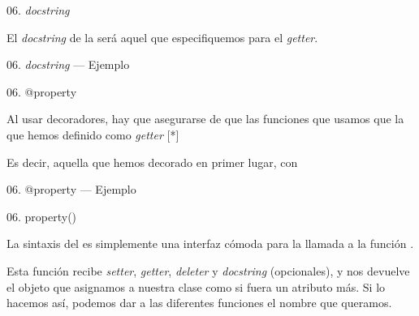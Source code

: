 \begin{frame}{06. \textit{docstring}}
  \begin{block}{}
    \large
    \centering
    El \textit{docstring} de la  será aquel que
     especifiquemos para el \textit{getter}.
  \end{block}
\end{frame}

\begin{frame}{06. \textit{docstring} — Ejemplo}
  \scriptsize
\end{frame}

\begin{frame}{06. @property}
  \begin{alertblock}{}
    \centering
    Al usar decoradores, hay que asegurarse de que las funciones que
    usamos  que la que hemos
    definido como \textit{getter} [*]
  \end{alertblock}

  \begin{center}
    \footnotesize
    \centering
        [*] Es decir, aquella que hemos decorado en primer lugar, con
  \end{center}
\end{frame}

\begin{frame}{06. @property — Ejemplo}
  \scriptsize
\end{frame}

\begin{frame}{06. property()}
  \begin{alertblock}{}
    \centering
    La sintaxis del  es simplemente una interfaz
    cómoda para la llamada a la función .
  \end{alertblock}

  \begin{center}
    \small
     Esta función recibe \textit{setter}, \textit{getter},
     \textit{deleter} y \textit{docstring} (opcionales), y nos
     devuelve el objeto  que asignamos a
     nuestra clase como si fuera un atributo más. Si lo hacemos así,
     podemos dar a las diferentes funciones el nombre que queramos.
  \end{center}
\end{frame}

